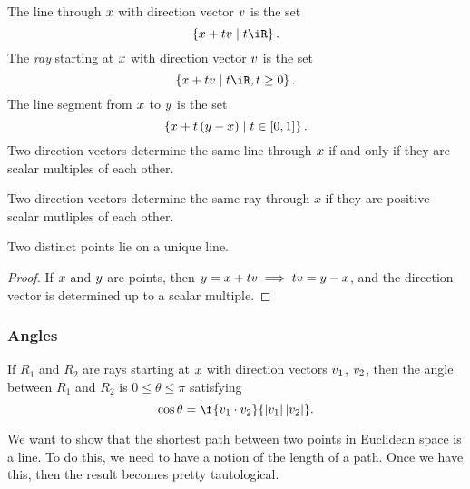 The line through $x$ with direction vector $v$ is the set
\begin{equation*}
	\left\{ \xx+t\vv \mid t\iR \right\}.
\end{equation*}
The \emph{ray} starting at $x$ with direction vector $v$ is the set
\begin{equation*}
	\left\{ \xx+t\vv \mid t\iR, t\geq 0 \right\}.
\end{equation*}
The line segment from $x$ to $y$ is the set
\begin{equation*}
	\left\{ x + t\left( y-x \right) \mid t\in[0,1] \right\}.
\end{equation*}
Two direction vectors determine the same line through $x$ if and only if they are scalar multiples of each other.

Two direction vectors determine the same ray through $x$ if they are positive scalar mutliples of each other.

\begin{proposition}
	Two distinct points lie on a unique line. %
\end{proposition}

\begin{proof}
	If $x$ and $y$ are points, then $y = x + tv \implies tv = y - x$, and the direction vector is determined up to a scalar multiple. %
\end{proof}


\subsubsection*{Angles} %
\label{ssub:angles}

If $R_1$ and $R_2$ are rays starting at $x$ with direction vectors $v_1$, $v_2$, then the angle between $R_1$ and $R_2$ is $0\leq \theta \leq \pi$ satisfying
\begin{equation*}
	\cos \theta = \f{\vv_1 \cdot \vv_2}{\left\vert \vv_1 \right\vert \left\vert \vv_2 \right\vert}.
\end{equation*}


	\pagebreak

We want to show that the shortest path between two points in Euclidean space is a line. To do this, we need to have a notion of the length of a path. Once we have this, then the result becomes pretty tautological.

